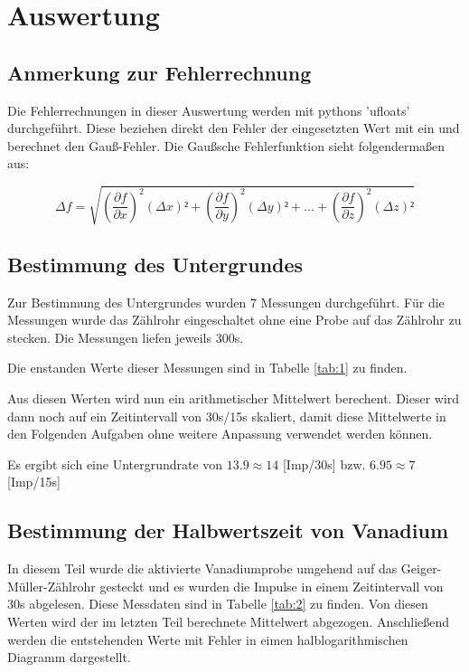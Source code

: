 \section{Auswertung}

\subsection{Anmerkung zur Fehlerrechnung}

Die Fehlerrechnungen in dieser Auswertung werden mit pythons 'ufloats' durchgeführt. Diese beziehen direkt den Fehler der eingesetzten Wert mit ein und berechnet den Gauß-Fehler. Die Gaußsche Fehlerfunktion sieht folgendermaßen aus:

\begin{displaymath}
    \Delta f = \sqrt{\left(\frac{\partial f}{\partial x}\right)^2 (\Delta x)² +
                     \left(\frac{\partial f}{\partial y}\right)^2 (\Delta y)² + ... +
                     \left(\frac{\partial f}{\partial z}\right)^2 (\Delta z)²
    }
\end{displaymath}


\subsection{Bestimmung des Untergrundes}

Zur Bestimmung des Untergrundes wurden 7 Messungen durchgeführt.
Für die Messungen wurde das Zählrohr eingeschaltet ohne eine Probe auf das Zählrohr zu stecken.
Die Messungen liefen jeweils 300s.

\noindent Die enstanden Werte dieser Messungen sind in Tabelle \ref{tab:1} zu finden.

\noindent Aus diesen Werten wird nun ein arithmetischer Mittelwert berechent.
Dieser wird dann noch auf ein Zeitintervall von 30s/15s skaliert, damit diese Mittelwerte in den Folgenden Aufgaben ohne weitere Anpassung verwendet werden können.

\noindent Es ergibt sich eine Untergrundrate von $13.9 \approx 14$ [Imp/30s] bzw. $6.95 \approx 7$ [Imp/15s]

\subsection{Bestimmung der Halbwertszeit von Vanadium}

In diesem Teil wurde  die aktivierte Vanadiumprobe umgehend auf das Geiger-Müller-Zählrohr gesteckt und es wurden die Impulse in einem Zeitintervall von 30s abgelesen.
Diese Messdaten sind in Tabelle \ref{tab:2} zu finden. 
Von diesen Werten wird der im letzten Teil berechnete Mittelwert abgezogen.
Anschließend werden die entstehenden Werte mit Fehler in eimen halblogarithmischen Diagramm dargestellt.

